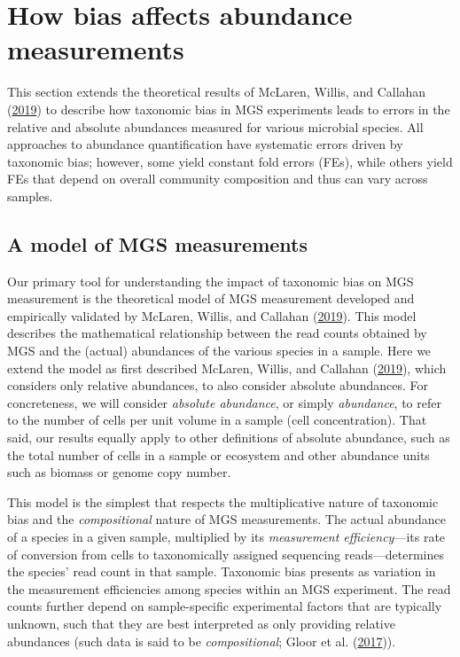\documentclass[
]{article}
\begin{document}
\hypertarget{abundance-measurement}{%
\section{How bias affects abundance measurements}\label{abundance-measurement}}

This section extends the theoretical results of McLaren, Willis, and Callahan (\protect\hyperlink{ref-mclaren2019cons}{2019}) to describe how taxonomic bias in MGS experiments leads to errors in the relative and absolute abundances measured for various microbial species.
All approaches to abundance quantification have systematic errors driven by taxonomic bias; however, some yield constant fold errors (FEs), while others yield FEs that depend on overall community composition and thus can vary across samples.

\hypertarget{a-model-of-mgs-measurements}{%
\subsection{A model of MGS measurements}\label{a-model-of-mgs-measurements}}

Our primary tool for understanding the impact of taxonomic bias on MGS measurement is the theoretical model of MGS measurement developed and empirically validated by McLaren, Willis, and Callahan (\protect\hyperlink{ref-mclaren2019cons}{2019}).
This model describes the mathematical relationship between the read counts obtained by MGS and the (actual) abundances of the various species in a sample.
Here we extend the model as first described McLaren, Willis, and Callahan (\protect\hyperlink{ref-mclaren2019cons}{2019}), which considers only relative abundances, to also consider absolute abundances.
For concreteness, we will consider \emph{absolute abundance}, or simply \emph{abundance}, to refer to the number of cells per unit volume in a sample (cell concentration).
That said, our results equally apply to other definitions of absolute abundance, such as the total number of cells in a sample or ecosystem and other abundance units such as biomass or genome copy number.

This model is the simplest that respects the multiplicative nature of taxonomic bias and the \emph{compositional} nature of MGS measurements.
The actual abundance of a species in a given sample, multiplied by its \emph{measurement efficiency}---its rate of conversion from cells to taxonomically assigned sequencing reads---determines the species' read count in that sample.
Taxonomic bias presents as variation in the measurement efficiencies among species within an MGS experiment.
The read counts further depend on sample-specific experimental factors that are typically unknown, such that they are best interpreted as only providing relative abundances (such data is said to be \emph{compositional}; Gloor et al. (\protect\hyperlink{ref-gloor2017micr}{2017})).
\end{document}
